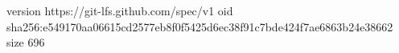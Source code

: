 version https://git-lfs.github.com/spec/v1
oid sha256:e549170aa06615cd2577eb8f0f5425d6ec38f91c7bde424f7ae6863b24e38662
size 696
